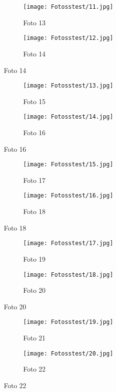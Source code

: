 \documentclass{bachproef-tin}
\begin{document}
\begin{figure}[h]
    \centering
    \begin{subfigure}{0.45\textwidth}
        \centering
        \texttt{[image: Fotosstest/11.jpg]}
        \caption{Foto 13}
    \end{subfigure}%
    \begin{subfigure}{0.45\textwidth}
        \centering
        \texttt{[image: Fotosstest/12.jpg]}
        \caption{Foto 14}
    \end{subfigure}
\end{figure}
\begin{figure}[h]
    \centering
    \begin{subfigure}{0.45\textwidth}
        \centering
        \texttt{[image: Fotosstest/13.jpg]}
        \caption{Foto 15}
    \end{subfigure}%
    \begin{subfigure}{0.45\textwidth}
        \centering
        \texttt{[image: Fotosstest/14.jpg]}
        \caption{Foto 16}
    \end{subfigure}
\end{figure}
\begin{figure}[h]
    \centering
    \begin{subfigure}{0.45\textwidth}
        \centering
        \texttt{[image: Fotosstest/15.jpg]}
        \caption{Foto 17}
    \end{subfigure}%
    \begin{subfigure}{0.45\textwidth}
        \centering
        \texttt{[image: Fotosstest/16.jpg]}
        \caption{Foto 18}
    \end{subfigure}
\end{figure}
\begin{figure}[h]
    \centering
    \begin{subfigure}{0.45\textwidth}
        \centering
        \texttt{[image: Fotosstest/17.jpg]}
        \caption{Foto 19}
    \end{subfigure}%
    \begin{subfigure}{0.45\textwidth}
        \centering
        \texttt{[image: Fotosstest/18.jpg]}
        \caption{Foto 20}
    \end{subfigure}
\end{figure}
\begin{figure}[h]
    \centering
    \begin{subfigure}{0.45\textwidth}
        \centering
        \texttt{[image: Fotosstest/19.jpg]}
        \caption{Foto 21}
    \end{subfigure}%
    \begin{subfigure}{0.45\textwidth}
        \centering
        \texttt{[image: Fotosstest/20.jpg]}
        \caption{Foto 22}
    \end{subfigure}
\end{figure}
\end{document}
